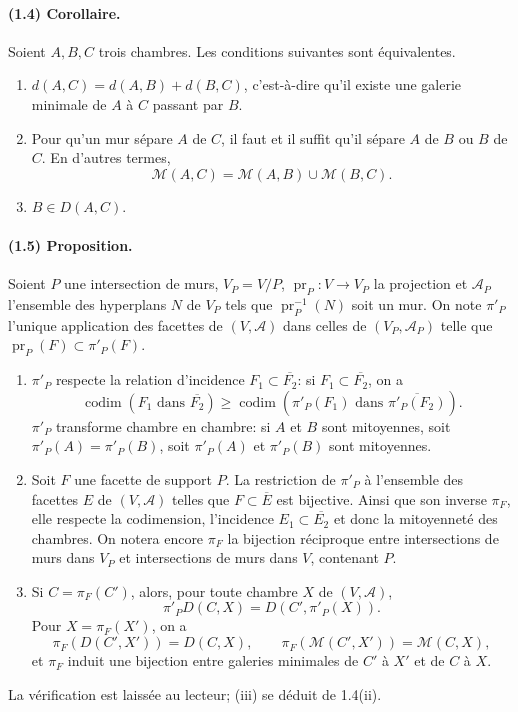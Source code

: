 \documentclass[10pt]{article}
\newcommand{\codim}{\operatorname{codim}}
\newcommand{\cl}[1]{\overline{#1}}
\newcommand{\mcA}{\mathcal A}
\newcommand{\mcM}{\mathcal M}
\begin{document}
\paragraph{(1.4) Corollaire.} Soient $A,B,C$ trois chambres. Les conditions suivantes sont équivalentes.
\begin{enumerate}[label=(\roman*)]
\item $d(A,C)=d(A,B)+d(B,C)$, c'est-à-dire qu'il existe une galerie minimale de $A$ à $C$ passant par $B$.
\item Pour qu'un mur sépare $A$ de $C$, il faut et il suffit qu'il sépare $A$ de $B$ ou $B$ de $C$. En d'autres termes,
\[
\mcM(A,C)=\mcM(A,B)\cup\mcM(B,C).
\]
\item $B\in D(A,C)$.
\end{enumerate}

\paragraph{(1.5) Proposition.} Soient $P$ une intersection de murs, $V_P=V/P$, $\operatorname{pr}_P:V\to V_P$ la projection et $\mcA_P$ l'ensemble des hyperplans $N$ de $V_P$ tels que $\operatorname{pr}_P^{-1}(N)$ soit un mur. On note $\pi'_P$ l'unique application des facettes de $(V,\mcA)$ dans celles de $(V_P,\mcA_P)$ telle que $\operatorname{pr}_P(F)\subset \pi'_P(F)$.
\begin{enumerate}[label=(\roman*)]
\item $\pi'_P$ respecte la relation d'incidence $F_1\subset\cl{F_2}$: si $F_1\subset\cl{F_2}$, on a
\[
\codim(F_1\text{ dans }\cl{F_2})\ge
\codim(\pi'_P(F_1)\text{ dans }\cl{\pi'_P(F_2)}).
\]
$\pi'_P$ transforme chambre en chambre: si $A$ et $B$ sont mitoyennes, soit $\pi'_P(A)=\pi'_P(B)$, soit $\pi'_P(A)$ et $\pi'_P(B)$ sont mitoyennes.
\item Soit $F$ une facette de support $P$. La restriction de $\pi'_P$ à l'ensemble des facettes $E$ de $(V,\mcA)$ telles que $F\subset\cl E$ est bijective. Ainsi que son inverse $\pi_F$, elle respecte la codimension, l'incidence $E_1\subset\cl{E_2}$ et donc la mitoyenneté des chambres. On notera encore $\pi_F$ la bijection réciproque entre intersections de murs dans $V_P$ et intersections de murs dans $V$, contenant $P$.
\item Si $C=\pi_F(C')$, alors, pour toute chambre $X$ de $(V,\mcA)$,
\[
\pi'_P D(C,X)=D(C',\pi'_P(X)).
\]
Pour $X=\pi_F(X')$, on a
\[
\pi_F(D(C',X'))=D(C,X),\qquad
\pi_F(\mcM(C',X'))=\mcM(C,X),
\]
et $\pi_F$ induit une bijection entre galeries minimales de $C'$ à $X'$ et de $C$ à $X$.
\end{enumerate}
La vérification est laissée au lecteur; (iii) se déduit de 1.4(ii).
\end{document}
